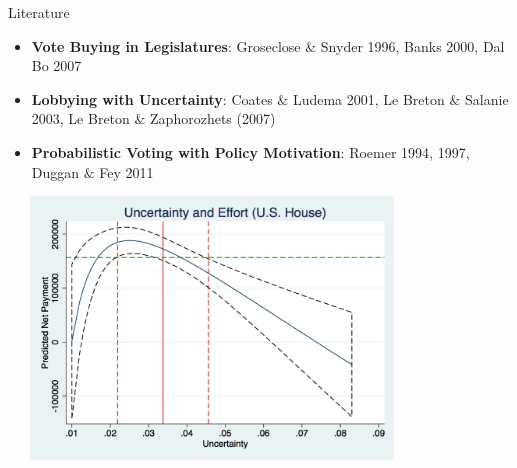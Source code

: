 \documentclass[handout]{beamer}
\begin{document}
\begin{frame}{Literature}
\pause
\begin{itemize}[<+->]
	\item \textbf{Vote Buying in Legislatures}: Groseclose $\&$ Snyder 1996, Banks 2000, Dal Bo 2007
	\item \textbf{Lobbying with Uncertainty}: Coates $\&$ Ludema 2001, Le Breton $\&$ Salanie 2003, Le Breton $\&$ Zaphorozhets (2007)
	\item \textbf{Probabilistic Voting with Policy Motivation}: Roemer 1994, 1997, Duggan $\&$ Fey 2011
\end{itemize}
\end{frame} 





\begin{frame}
\includegraphics[height=2.75in, width=4.25in]{graph1.jpg}
\end{frame}


\end{document}
